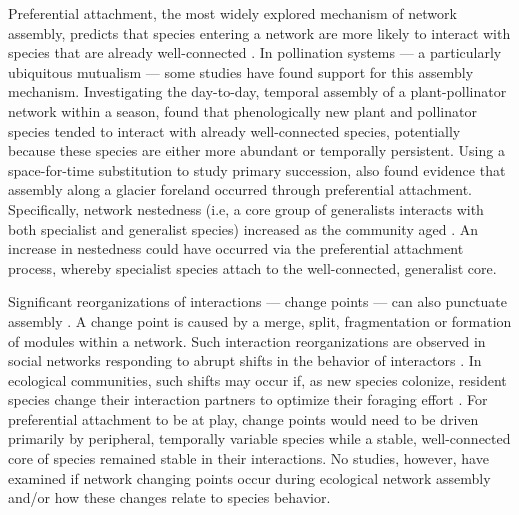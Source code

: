 \documentclass[12pt]{article}
\begin{document}
Preferential attachment, the most widely explored mechanism of network
assembly, predicts that species entering a network are more likely to
interact with species that are already well-connected \citep[the
``rich-get-richer'' principle,][]{barabasi1999emergence}. In
pollination systems --- a particularly ubiquitous mutualism
\citep{ollerton-2011-321, klein-2007-303} --- some studies have found
support for this assembly mechanism. Investigating the day-to-day,
temporal assembly of a plant-pollinator network within a season,
\cite{Olesen2008} found that phenologically new plant and pollinator
species tended to interact with already well-connected species,
potentially because these species are either more abundant or
temporally persistent. Using a space-for-time substitution to study
primary succession, \cite{albrecht2010plant} also found evidence that
assembly along a glacier foreland occurred through preferential
attachment. Specifically, network nestedness (i.e, a core group of
generalists interacts with both specialist and generalist species)
increased as the community aged \citep{albrecht2010plant}. An increase
in nestedness could have occurred via the preferential attachment
process, whereby specialist species attach to the well-connected,
generalist core.

Significant reorganizations of interactions --- change points --- can
also punctuate assembly \citep{peel2014detecting}. A change point is
caused by a merge, split, fragmentation or formation of modules within
a network. Such interaction reorganizations are observed in social
networks responding to abrupt shifts in the behavior of interactors
\citep{peel2014detecting}. In ecological communities, such shifts may
occur if, as new species colonize, resident species change their
interaction partners to optimize their foraging effort
\citep{pyke1984optimal, Bluthgen2007, valdovinos2010consequences,
  albrecht2010plant, valdovinos2013adaptive}. For preferential
attachment to be at play, change points would need to be driven
primarily by peripheral, temporally variable species while a stable,
well-connected core of species remained stable in their
interactions. No studies, however, have examined if network changing
points occur during ecological network assembly and/or how these
changes relate to species behavior.
\end{document}
